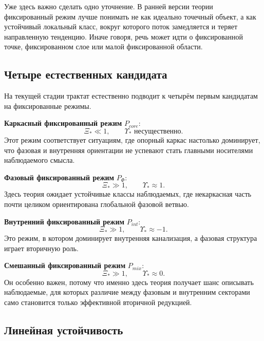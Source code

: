 \documentclass[12pt,a4paper]{article}
\begin{document}
Уже здесь важно сделать одно уточнение. В ранней версии теории фиксированный режим лучше понимать не как идеально точечный объект, а как устойчивый локальный класс, вокруг которого поток замедляется и теряет направленную тенденцию. Иначе говоря, речь может идти о фиксированной точке, фиксированном слое или малой фиксированной области.

\subsection{Четыре естественных кандидата}

На текущей стадии трактат естественно подводит к четырём первым кандидатам на фиксированные режимы.

\textbf{Каркасный фиксированный режим} \(P_{core}\):
\begin{equation}
\Xi_* \ll 1,
\qquad
\Upsilon_* \text{ несущественно.}
\end{equation}
Этот режим соответствует ситуациям, где опорный каркас настолько доминирует, что фазовая и внутренняя ориентации не успевают стать главными носителями наблюдаемого смысла.

\textbf{Фазовый фиксированный режим} \(P_{\Phi}\):
\begin{equation}
\Xi_* \gg 1,
\qquad
\Upsilon_* \approx 1.
\end{equation}
Здесь теория ожидает устойчивые классы наблюдаемых, где некаркасная часть почти целиком ориентирована глобальной фазовой ветвью.

\textbf{Внутренний фиксированный режим} \(P_{int}\):
\begin{equation}
\Xi_* \gg 1,
\qquad
\Upsilon_* \approx -1.
\end{equation}
Это режим, в котором доминирует внутренняя канализация, а фазовая структура играет вторичную роль.

\textbf{Смешанный фиксированный режим} \(P_{mix}\):
\begin{equation}
\Xi_* \gg 1,
\qquad
\Upsilon_* \approx 0.
\end{equation}
Он особенно важен, потому что именно здесь теория получает шанс описывать наблюдаемые, для которых различие между фазовым и внутренним секторами само становится только эффективной вторичной редукцией.

\subsection{Линейная устойчивость}
\end{document}
